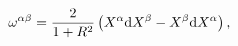 \begin{equation}
\omega^{\alpha \beta} = \frac{2}{1+R^2} \left( X^\alpha {\rm d}
X^\beta - X^\beta {\rm d} X^\alpha \right),
\end{equation}

